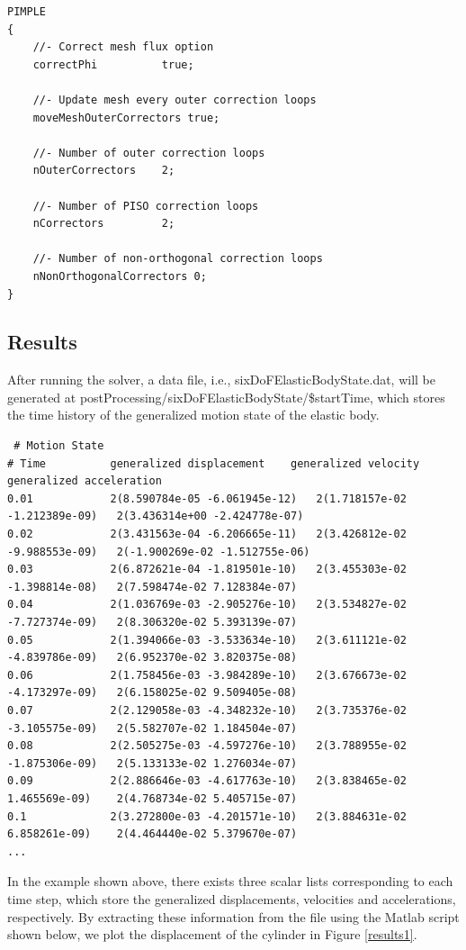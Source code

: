 \begin{lstlisting}
PIMPLE
{
    //- Correct mesh flux option
    correctPhi          true;

    //- Update mesh every outer correction loops
    moveMeshOuterCorrectors true;

    //- Number of outer correction loops
    nOuterCorrectors    2;

    //- Number of PISO correction loops
    nCorrectors         2;

    //- Number of non-orthogonal correction loops
    nNonOrthogonalCorrectors 0;
}
\end{lstlisting}

\subsection{Results}

After running the solver, a data file, i.e., sixDoFElasticBodyState.dat, will be generated at postProcessing/sixDoFElasticBodyState/\$startTime, which stores the time history of the generalized motion state of the elastic body.

\begin{lstlisting}
 # Motion State
# Time        	generalized displacement	generalized velocity	generalized acceleration
0.01          	2(8.590784e-05 -6.061945e-12)	2(1.718157e-02 -1.212389e-09)	2(3.436314e+00 -2.424778e-07)
0.02          	2(3.431563e-04 -6.206665e-11)	2(3.426812e-02 -9.988553e-09)	2(-1.900269e-02 -1.512755e-06)
0.03          	2(6.872621e-04 -1.819501e-10)	2(3.455303e-02 -1.398814e-08)	2(7.598474e-02 7.128384e-07)
0.04          	2(1.036769e-03 -2.905276e-10)	2(3.534827e-02 -7.727374e-09)	2(8.306320e-02 5.393139e-07)
0.05          	2(1.394066e-03 -3.533634e-10)	2(3.611121e-02 -4.839786e-09)	2(6.952370e-02 3.820375e-08)
0.06          	2(1.758456e-03 -3.984289e-10)	2(3.676673e-02 -4.173297e-09)	2(6.158025e-02 9.509405e-08)
0.07          	2(2.129058e-03 -4.348232e-10)	2(3.735376e-02 -3.105575e-09)	2(5.582707e-02 1.184504e-07)
0.08          	2(2.505275e-03 -4.597276e-10)	2(3.788955e-02 -1.875306e-09)	2(5.133133e-02 1.276034e-07)
0.09          	2(2.886646e-03 -4.617763e-10)	2(3.838465e-02 1.465569e-09)	2(4.768734e-02 5.405715e-07)
0.1           	2(3.272800e-03 -4.201571e-10)	2(3.884631e-02 6.858261e-09)	2(4.464440e-02 5.379670e-07)
...
\end{lstlisting}

\noindent In the example shown above, there exists three scalar lists corresponding to each time step, which store the generalized displacements, velocities and accelerations, respectively. By extracting these information from the file using the Matlab script shown below, we plot the displacement of the cylinder in Figure \ref{results1}.

